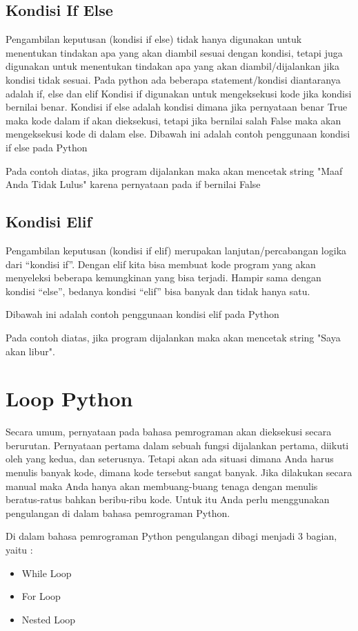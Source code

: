 \subsection{Kondisi If Else}
Pengambilan keputusan (kondisi if else) tidak hanya digunakan untuk menentukan tindakan apa yang akan diambil sesuai dengan kondisi, tetapi juga digunakan untuk menentukan tindakan apa yang akan diambil/dijalankan jika kondisi tidak sesuai. Pada python ada beberapa statement/kondisi diantaranya adalah if, else dan elif Kondisi if digunakan untuk mengeksekusi kode jika kondisi bernilai benar. Kondisi if else adalah kondisi dimana jika pernyataan benar True maka kode dalam if akan dieksekusi, tetapi jika bernilai salah False maka akan mengeksekusi kode di dalam else. Dibawah ini adalah contoh penggunaan kondisi if else pada Python

Pada contoh diatas, jika program dijalankan maka akan mencetak string "Maaf Anda Tidak Lulus" karena pernyataan pada if bernilai False

\subsection{Kondisi Elif}
Pengambilan keputusan (kondisi if elif) merupakan lanjutan/percabangan logika dari “kondisi if”. Dengan elif kita bisa membuat kode program yang akan menyeleksi beberapa kemungkinan yang bisa terjadi. Hampir sama dengan kondisi “else”, bedanya kondisi “elif” bisa banyak dan tidak hanya satu.

Dibawah ini adalah contoh penggunaan kondisi elif pada Python

Pada contoh diatas, jika program dijalankan maka akan mencetak string "Saya akan libur".

\section{Loop Python}
Secara umum, pernyataan pada bahasa pemrograman akan dieksekusi secara berurutan. Pernyataan pertama dalam sebuah fungsi dijalankan pertama, diikuti oleh yang kedua, dan seterusnya. Tetapi akan ada situasi dimana Anda harus menulis banyak kode, dimana kode tersebut sangat banyak. Jika dilakukan secara manual maka Anda hanya akan membuang-buang tenaga dengan menulis beratus-ratus bahkan beribu-ribu kode. Untuk itu Anda perlu menggunakan pengulangan di dalam bahasa pemrograman Python.

Di dalam bahasa pemrograman Python pengulangan dibagi menjadi 3 bagian, yaitu :
\begin{itemize}
\item While Loop
\item For Loop
\item Nested Loop
\end{itemize}


